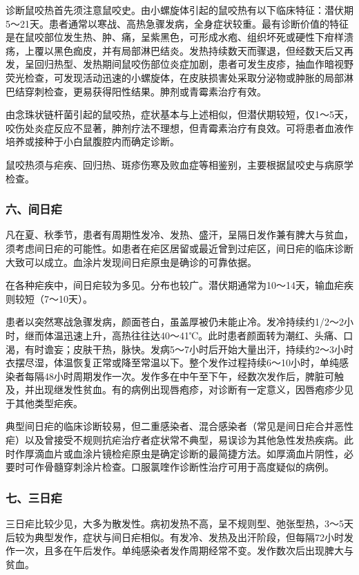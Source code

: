 诊断鼠咬热首先须注意鼠咬史。由小螺旋体引起的鼠咬热有以下临床特征：潜伏期5～21天。患者通常以寒战、高热急骤发病，全身症状较重。最有诊断价值的特征是在鼠咬部位发生热、肿、痛，呈紫黑色，可形成水疱、组织坏死或硬性下疳样溃疡，上覆以黑色痂皮，并有局部淋巴结炎。发热持续数天而骤退，但经数天后又再发，呈回归热型、发热期间鼠咬伤部位炎症加剧，患者可发生皮疹，抽血作暗视野荧光检查，可发现活动迅速的小螺旋体，在皮肤损害处采取分泌物或肿胀的局部淋巴结穿刺检查，更易获得阳性结果。胂剂或青霉素治疗有效。

由念珠状链杆菌引起的鼠咬热，症状基本与上述相似，但潜伏期较短，仅1～5天，咬伤处炎症反应不显著，胂剂疗法不理想，但青霉素治疗有良效。可将患者血液作培养或接种于小白鼠腹腔内而确定诊断。

鼠咬热须与疟疾、回归热、斑疹伤寒及败血症等相鉴别，主要根据鼠咬史与病原学检查。

\subsubsection{六、间日疟}

凡在夏、秋季节，患者有周期性发冷、发热、盛汗，呈隔日发作兼有脾大与贫血，须考虑间日疟的可能性。如患者在疟区居留或最近曾到过疟区，间日疟的临床诊断大致可以成立。血涂片发现间日疟原虫是确诊的可靠依据。

在各种疟疾中，间日疟较为多见。分布也较广。潜伏期通常为10～14天，输血疟疾则较短（7～10天）。

患者以突然寒战急骤发病，颜面苍白，虽盖厚被仍未能止冷。发冷持续约1/2～2小时，继而体温迅速上升，高热往往达40～41℃。此时患者颜面转为潮红、头痛、口渴，有时谵妄；皮肤干热，脉快。发病5～7小时后开始大量出汗，持续约2～3小时衣摆尽湿，体温恢复正常或降至常温以下。整个发作过程持续6～10小时，单纯感染者每隔48小时周期发作一次。发作多在中午至下午，经数次发作后，脾脏可触及，并出现继发性贫血。有的病例出现唇疱疹，对诊断有一定意义，因唇疱疹少见于其他类型疟疾。

典型间日疟的临床诊断较易，但二重感染者、混合感染者（常见是间日疟合并恶性疟）以及曾接受不规则抗疟治疗者症状常不典型，易误诊为其他急性发热疾病。此时作厚滴血片或血涂片镜检疟原虫是确定诊断的最简捷方法。如厚滴血片阴性，必要时可作骨髓穿刺涂片检查。口服氯喹作诊断性治疗可用于高度疑似的病例。

\subsubsection{七、三日疟}

三日疟比较少见，大多为散发性。病初发热不高，呈不规则型、弛张型热，3～5天后较为典型发作，症状与间日疟相似。有发冷、发热及出汗阶段，但每隔72小时发作一次，且多在午后发作。单纯感染者发作周期经常不变。发作数次后出现脾大与贫血。

